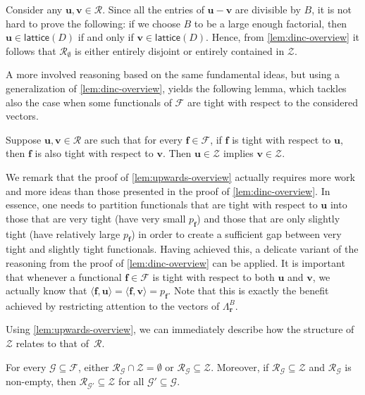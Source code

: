 \documentclass{article}
\newcommand{\tup}[1]{{\mathbf{#1}}}
\newcommand{\ff}{\tup f}
\newcommand{\rr}{\tup r}
\newcommand{\uu}{\tup u}
\newcommand{\myvv}{\tup v} %
\newcommand{\Ff}{\mathcal{F}}
\newcommand{\Gg}{\mathcal{G}}
\newcommand{\Rr}{\mathcal{R}}
\newcommand{\Zz}{\mathcal{Z}}
\newcommand{\sca}[2]{\langle #1,#2\rangle}
\newcommand{\lattice}{\mathsf{lattice}}
\begin{document}
Consider any $\uu,\myvv\in \Rr$. Since all the entries of $\uu-\myvv$ are divisible by $B$, it is not hard to prove the following: if we choose $B$ to be a large enough factorial, then $\uu\in \lattice(D)$ if and only if $\myvv\in \lattice(D)$. Hence, from \cref{lem:dinc-overview} it follows that $\Rr_\emptyset$ is either entirely disjoint or entirely contained in $\Zz$.

A more involved reasoning based on the same fundamental ideas, but using a generalization of \cref{lem:dinc-overview}, yields the following lemma, which tackles also the case when some functionals of $\Ff$ are tight with respect to the considered vectors.

\begin{lemma}\label{lem:upwards-overview}
Suppose $\uu,\myvv\in \Rr$ are such that for every $\ff\in \Ff$, if $\ff$ is tight with respect to $\uu$, then $\ff$ is also tight with respect to $\myvv$. Then $\uu\in \Zz$ implies $\myvv\in \Zz$.
\end{lemma}

We remark that the proof of \cref{lem:upwards-overview} actually requires more work and more ideas than those presented in the proof of \cref{lem:dinc-overview}. In essence, one needs to partition functionals that are tight with respect to $\uu$ into those that are very tight (have very small $p_\ff$) and those that are only slightly tight (have relatively large $p_\ff$) in order to create a sufficient gap between very tight and slightly tight functionals. Having achieved this, a delicate variant of the reasoning from the proof of \cref{lem:dinc-overview} can be applied. It is important that whenever a functional $\ff\in \Ff$ is tight with respect to both $\uu$ and $\myvv$, we actually know that $\sca{\ff}{\uu}=\sca{\ff}{\myvv}=p_\ff$. Note that this is exactly the benefit achieved by restricting attention to the vectors of $\Lambda_\rr^B$.

Using \cref{lem:upwards-overview}, we can immediately describe how the structure of $\Zz$ relates to that of~$\Rr$.

\begin{corollary}\label{cor:structure}
For every $\Gg\subseteq \Ff$, either $\Rr_\Gg\cap \Zz=\emptyset$ or $\Rr_\Gg\subseteq \Zz$. Moreover, if $\Rr_\Gg\subseteq \Zz$ and $\Rr_{\Gg}$ is non-empty, then $\Rr_{\Gg'}\subseteq \Zz$ for all $\Gg'\subseteq \Gg$.
\end{corollary}
\end{document}
